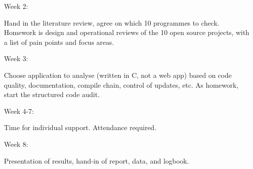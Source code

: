 Week 2:

Hand in the literature review, agree on which 10 programmes to check. Homework is design and operational reviews of the 10 open source projects, with a list of pain points and focus areas.\\\mbox{}

Week 3:

Choose application to analyse (written in C, not a web app) based on code quality, documentation, compile chain, control of updates, etc. As homework, start the structured code audit.\\\mbox{}

Week 4-7:

Time for individual support. Attendance required.\\\mbox{}

Week 8:

Presentation of results, hand-in of report, data, and logbook.\\\mbox{}